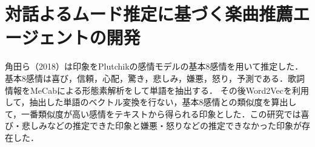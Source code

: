 \section{対話よるムード推定に基づく楽曲推薦エージェントの開発}
角田ら（2018）\cite{5}は印象をPlutchikの感情モデル\cite{6}の基本8感情を用いて推定した．基本8感情は喜び，信頼，心配，驚き，悲しみ，嫌悪，怒り，予測である．歌詞情報をMeCabによる形態素解析をして単語を抽出する．
その後Word2Vecを利用して，抽出した単語のベクトル変換を行ない，基本8感情との類似度を算出して，一番類似度が高い感情をテキストから得られる印象とした．この研究では喜び・悲しみなどの推定できた印象と嫌悪・怒りなどの推定できなかった印象が存在した．